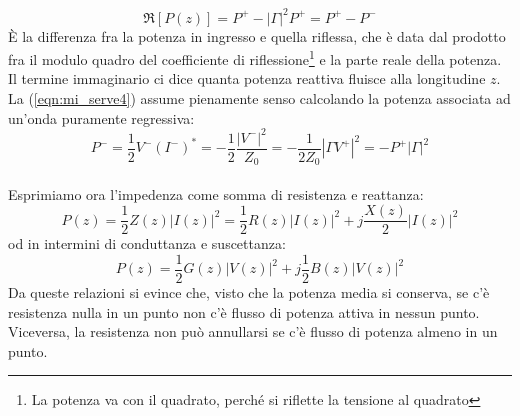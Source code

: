 \documentclass{book}
\begin{document}
        \begin{equation} 
            \label{eqn:mi_serve4}
            \Re[P(z)]=P^{+}-|\Gamma|^{2}P^{+} = P^{+}-P^{-}
        \end{equation}
        È la differenza fra la potenza in ingresso e quella riflessa, che è data dal prodotto fra il modulo quadro 
        del coefficiente di riflessione\footnote{La potenza va con il quadrato, perché si riflette la tensione al quadrato} e
        la parte reale della potenza.
        Il termine immaginario ci dice quanta potenza reattiva fluisce alla longitudine $z$. \\
        La (\ref{eqn:mi_serve4}) assume pienamente senso calcolando la potenza associata ad un'onda puramente regressiva:
        \begin{equation}
            P^{-}=\frac{1}{2}V^{-}(I^{-})^{*}=-\frac{1}{2}\frac{|V^{-}|^{2}}{Z_{0}} = 
            -\frac{1}{2Z_{0}}|\Gamma V^{+}|^{2} = - P^{+}|\Gamma|^{2}
        \end{equation}
        \\ Esprimiamo ora l'impedenza come somma di resistenza e reattanza:
        \begin{equation}
            P(z)=\frac{1}{2}Z(z)|I(z)|^{2} = \frac{1}{2}R(z)|I(z)|^{2}+j\frac{X(z)}{2}|I(z)|^{2}
        \end{equation}
        od in intermini di conduttanza e suscettanza:
        \begin{equation}
            P(z)=\frac{1}{2}G(z)|V(z)|^{2}+j\frac{1}{2}B(z)|V(z)|^{2}
        \end{equation}
        Da queste relazioni si evince che, visto che la potenza media si conserva, se c'è resistenza nulla in un punto non c'è flusso 
        di potenza attiva in nessun punto. Viceversa, la resistenza non può annullarsi se c'è flusso di potenza almeno in un punto.
\end{document}

